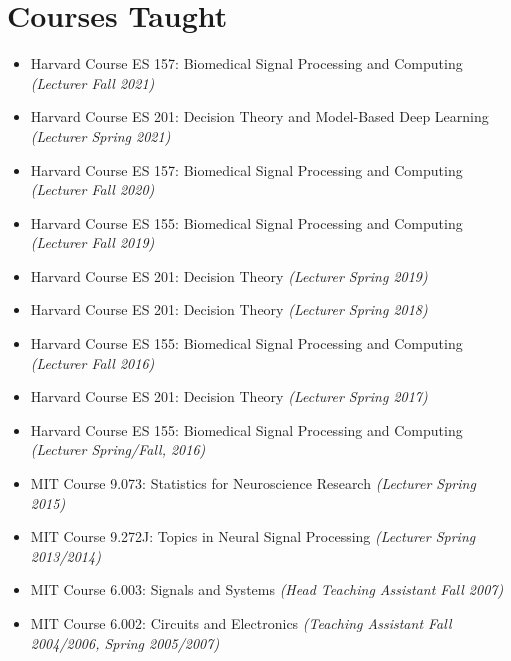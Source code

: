 \section*{Courses Taught}

  \begin{itemize}
  	  \item Harvard Course ES 157: Biomedical Signal Processing and Computing \emph{(Lecturer Fall 2021)}    
  	  \item Harvard Course ES 201: Decision Theory and Model-Based Deep Learning \emph{(Lecturer Spring 2021)}  
  	  \item Harvard Course ES 157: Biomedical Signal Processing and Computing \emph{(Lecturer Fall 2020)}  
  	  \item Harvard Course ES 155: Biomedical Signal Processing and Computing \emph{(Lecturer Fall 2019)}
  	  \item Harvard Course ES 201: Decision Theory \emph{(Lecturer Spring 2019)}
    	  \item Harvard Course ES 201: Decision Theory \emph{(Lecturer Spring 2018)}
   	  \item Harvard Course ES 155: Biomedical Signal Processing and Computing \emph{(Lecturer Fall 2016)}
  	  \item Harvard Course ES 201: Decision Theory \emph{(Lecturer Spring 2017)}
   	  \item Harvard Course ES 155: Biomedical Signal Processing and Computing \emph{(Lecturer Spring/Fall, 2016)}
      \item MIT Course 9.073: Statistics for Neuroscience Research \emph{(Lecturer Spring 2015)}
      \item MIT Course 9.272J: Topics in Neural Signal Processing \emph{(Lecturer Spring 2013/2014)}
      \item MIT Course 6.003: Signals and Systems \emph{(Head Teaching Assistant Fall 2007)}
      \item MIT Course 6.002: Circuits and Electronics \emph{(Teaching Assistant Fall 2004/2006, Spring 2005/2007)}
  \end{itemize}
